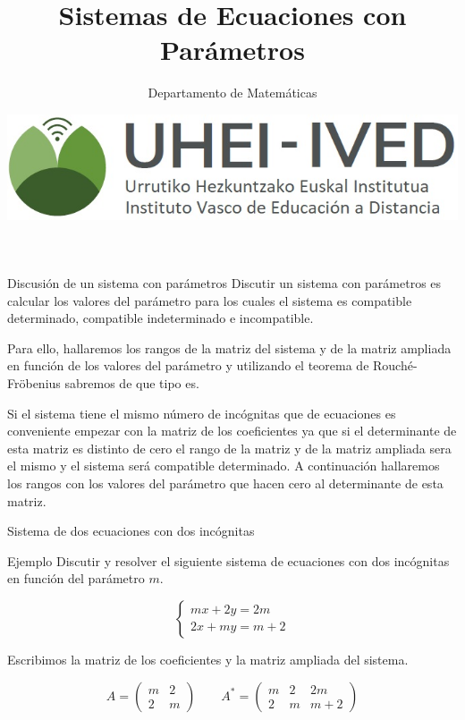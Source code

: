\documentclass[9pt]{beamer}
\author{Departamento de Matemáticas}
\title{Sistemas de Ecuaciones con Parámetros}
\date{\includegraphics[scale=0.15]{imagenes/logoa.jpg}}
\begin{document}
\begin{frame}
\titlepage
\end{frame}

\begin{frame}
\tableofcontents
\end{frame}

\begin{frame}{Discusión de un sistema con parámetros}
Discutir un sistema con parámetros es calcular los valores del parámetro para los cuales el sistema es compatible determinado, compatible indeterminado e incompatible.

Para ello, hallaremos los rangos de la matriz del sistema y de la matriz ampliada en función de los valores del parámetro y utilizando el teorema de Rouché-Fröbenius sabremos de que tipo es.

Si el sistema tiene el mismo número de incógnitas que de ecuaciones es conveniente empezar con la matriz de los coeficientes ya que si el determinante de esta matriz es distinto de cero el rango de la matriz y de la matriz ampliada sera el mismo y el sistema será compatible determinado. A continuación hallaremos los rangos con los valores del parámetro que hacen cero al determinante de esta matriz.
\end{frame}


\begin{frame}{Sistema de dos ecuaciones con dos incógnitas }
\begin{exampleblock}{Ejemplo}
Discutir y resolver el siguiente sistema de ecuaciones con dos incógnitas en función del parámetro $m$.

\[ \begin{cases} mx+2y = 2m \\ 2x+my = m+2 \end{cases} \]

\end{exampleblock}

\pause

Escribimos la matriz de los coeficientes y la matriz ampliada del sistema.

\[ A=\begin{pmatrix}
m & 2 \\ 2 & m
\end{pmatrix} \qquad A^*=\begin{pmatrix}
m & 2 & 2m \\ 2 & m & m+2
\end{pmatrix} \]
\end{frame}
\end{document}
